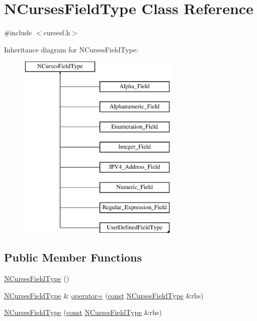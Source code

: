 \hypertarget{class_n_curses_field_type}{\section{N\-Curses\-Field\-Type Class Reference}
\label{class_n_curses_field_type}
}


{\ttfamily \#include $<$cursesf.\-h$>$}

Inheritance diagram for N\-Curses\-Field\-Type\-:\begin{figure}[H]
\begin{center}
\leavevmode
\includegraphics[height=9.000000cm]{class_n_curses_field_type}
\end{center}
\end{figure}
\subsection*{Public Member Functions}
\begin{DoxyCompactItemize}
\item 
\hyperlink{class_n_curses_field_type_a7a9152b7a86cd460f3ba8a86163a4be9}{N\-Curses\-Field\-Type} ()
\item 
\hyperlink{class_n_curses_field_type}{N\-Curses\-Field\-Type} \& \hyperlink{class_n_curses_field_type_ae7c89fd4b0be06f7fe763245ab2fc1d0}{operator=} (\hyperlink{term__entry_8h_a57bd63ce7f9a353488880e3de6692d5a}{const} \hyperlink{class_n_curses_field_type}{N\-Curses\-Field\-Type} \&rhs)
\item 
\hyperlink{class_n_curses_field_type_a120324292341ba0286326d4e0319a64e}{N\-Curses\-Field\-Type} (\hyperlink{term__entry_8h_a57bd63ce7f9a353488880e3de6692d5a}{const} \hyperlink{class_n_curses_field_type}{N\-Curses\-Field\-Type} \&rhs)
\end{DoxyCompactItemize}
